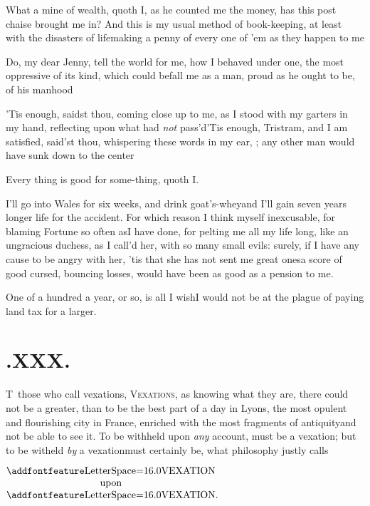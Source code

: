 \documentclass{article}
\begin{document}
\tsh What a mine of wealth, quoth I, as\break
he counted me the money, has this post chaise brought me in? And
this is my usual method of book-keeping, at least with the
disasters of life\tsk making a penny of every one of ’em as they
happen to me\tsh

\tsh Do, my dear Jenny, tell the world for me,
how I behaved under one, the most oppressive of its kind, which
could befall me as a man, proud as he ought to be, of his
manhood\tsh

’Tis enough, saidst thou, coming close up to me, as I
stood with my garters in my hand, reflecting upon what had \textit{not}
pass’d\tsh ’Tis enough, Tristram, and I
am satisfied, said’st thou, whispering these\break
words in my ear,   \break
{} ;\tsk{}  
\tsh any other man would have sunk down
to the center\tsh

\tsh Every thing is good for some-\break thing, quoth I.

\tsh I’ll go into Wales for six weeks, and drink goat’s-whey\tsk and I’ll gain seven
years longer life for the accident. For which reason I think myself inexcusable, for
blaming Fortune so often as\break I have done, for pelting me all my life long, like an
ungracious duchess, as I call’d her, with so many small evils: surely, if I have any
cause to be angry with her, ’tis that she has not sent me great ones\tsk a score of
good cursed, bouncing losses, would have been as good as a pension to me.

\tsh One of a hundred a year, or so, is all I wish\tsk I would not be at the plague of
paying land tax for a larger.

\section{.\enspace XXX.}

\lettrine{T}{\,} those who call vexations,\break
\textsc{Vexations}, as knowing what they are,
there could not be a greater, than to be the best part of a day in Lyons, the most
opulent and flourishing city in France, enriched with the most fragments of
antiquity\tsk and not be able to see it. To be withheld upon \textit{any} account,
must be a vexation; but to be witheld \textit{by} a
vexation\tsh must certainly\break
be, what philosophy justly calls

\medskip
\centerline{$\vcenter{\halign{\hss # \hss\cr
\lss{VEXATION}\cr
upon\cr
\lss{VEXATION}\rlap{.}\cr}}$}
\eject
\end{document}
